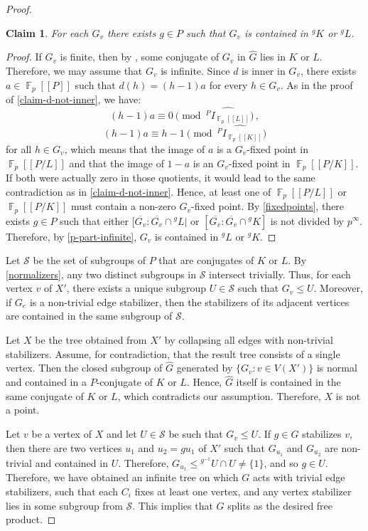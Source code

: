 \documentclass[a4paper]{amsart}
\newtheorem{claim}[lem]{Claim}
\theoremstyle{definition}
\theoremstyle{remark}
\DeclareMathOperator{\bbf}{\mathbb{F}}
\newcommand{\FFalgebra}[1]{\bbf_p[\![#1]\!]}
\begin{document}
\begin{proof}
\begin{claim} For each \(G_v\) there exists \(g \in P\) such that \(G_v\) is contained in \(^gK\) or \(^g L\).
\end{claim}
\begin{proof} If \(G_v\) is finite, then by \cite[Cor. 7.1.3(a)]{ribesProfiniteGraphsGroups2017}, some conjugate of \(G_v\) in \(\widehat{G}\) lies in \(K\) or \(L\).  Therefore, we may assume that \(G_v\) is infinite. Since \(d\) is inner in \(G_v\), there exists \(a \in \FFalgebra{P}\) such that \(d(h) = (h-1)a\) for every \(h \in G_v\). As in the proof of \cref{claim-d-not-inner}, we have:
\[(h-1)a \equiv 0 \pmod{\widehat{^{P}I_{\FFalgebra{L}}}}\,,\]
\[(h-1)a \equiv h-1 \pmod{\widehat{^{P}I_{\FFalgebra{K}}}}\]
for all \(h \in G_v\), which means that the image of \(a\) is a \(G_v\)-fixed point in \(\FFalgebra{P/L}\) and that the image of \(1-a\) is an \(G_v\)-fixed point in \(\FFalgebra{P/K}\). If both were actually zero in those quotients, it would lead to the same contradiction as in \cref{claim-d-not-inner}. Hence, at least one of \(\FFalgebra{P/L}\) or \(\FFalgebra{P/K}\) must contain a non-zero \(G_v\)-fixed point. By \cref{fixedpoints}, there exists \(g \in P\) such that  either \([\overline{G_v}\colon \overline{G_v} \cap {^gL}|\) or \([\overline{G_v}\colon \overline{G_v}\cap {^gK}]\) is not divided by \(p^{\infty}\). Therefore, by \cref{p-part-infinite}, \(G_v\) is contained in \(^gL\) or \(^gK\).  
\end{proof}

Let \(\mathcal{S}\) be the set of subgroups of \(P\) that are conjugates of \(K\) or \(L\). By \cref{normalizers}, any two distinct subgroups in \(\mathcal{S}\) intersect trivially. Thus, for each vertex \(v\) of \(X'\), there exists a unique subgroup \(U \in \mathcal{S}\) such that \(G_v \leq U\). Moreover, if \(G_e\) is a non-trivial edge stabilizer, then the stabilizers of its adjacent vertices are contained in the same subgroup of \(\mathcal{S}\).

Let \(X\) be the tree obtained from \(X'\) by collapsing all edges with non-trivial stabilizers. Assume, for contradiction, that the result tree consists of a single vertex. Then the closed subgroup of \(\widehat{G}\) generated by \(\{G_v\colon v \in V(X')\}\) is normal and contained in a \(P\)-conjugate of \(K\) or \(L\). Hence, \(\widehat{G}\) itself is contained in the same conjugate of \(K\) or \(L\), which contradicts our assumption. Therefore, \(X\) is not a point.

Let \(v\) be a vertex of \(X\) and let \(U \in \mathcal{S}\) be such that \(G_v \leq U\). If \(g \in G\) stabilizes \(v\), then there are two vertices \(u_1\) and \(u_2 = gu_1\) of \(X'\) such that \(G_{u_1}\) and \(G_{u_2}\) are non-trivial and contained in \(U\). Therefore, \(G_{u_1} \leq {^{g^{-1}}U} \cap U \neq \{1\}\), and so \(g \in U\). Therefore, we have obtained an infinite tree on which \(G\) acts with trivial edge stabilizers, such that each \(C_i\) fixes at least one vertex, and any vertex stabilizer lies in some subgroup from \(\mathcal{S}\). This implies that \(G\) splits as the desired free product.
\end{proof}
\end{document}
